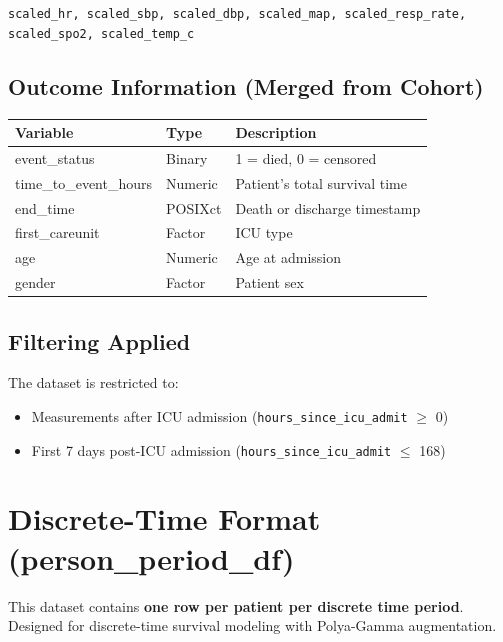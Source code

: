 \documentclass[11pt]{article}
\begin{document}
\begin{center}
\texttt{scaled\_hr, scaled\_sbp, scaled\_dbp, scaled\_map, scaled\_resp\_rate, scaled\_spo2, scaled\_temp\_c}
\end{center}

\subsection{Outcome Information (Merged from Cohort)}

\begin{longtable}{L{4cm}L{2cm}L{8cm}}
\toprule
\textbf{Variable} & \textbf{Type} & \textbf{Description} \\
\midrule
\endhead
event\_status & Binary & 1 = died, 0 = censored \\
time\_to\_event\_hours & Numeric & Patient's total survival time \\
end\_time & POSIXct & Death or discharge timestamp \\
first\_careunit & Factor & ICU type \\
age & Numeric & Age at admission \\
gender & Factor & Patient sex \\
\bottomrule
\end{longtable}

\subsection{Filtering Applied}

The dataset is restricted to:
\begin{itemize}[leftmargin=*, nosep]
    \item Measurements after ICU admission (\texttt{hours\_since\_icu\_admit} $\geq$ 0)
    \item First 7 days post-ICU admission (\texttt{hours\_since\_icu\_admit} $\leq$ 168)
\end{itemize}

\section{Discrete-Time Format (person\_period\_df)}

This dataset contains \textbf{one row per patient per discrete time period}. Designed for discrete-time survival modeling with Polya-Gamma augmentation.
\end{document}

